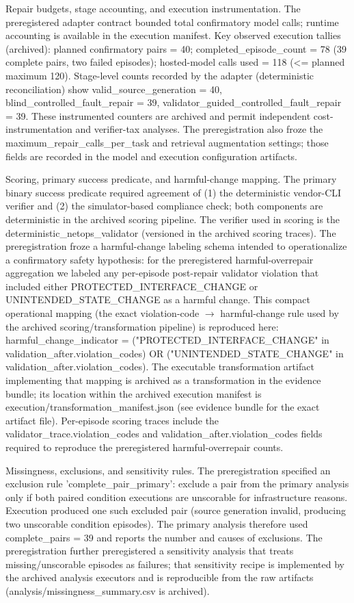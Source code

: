 \documentclass[conference]{IEEEtran}
\begin{document}
Repair budgets, stage accounting, and execution instrumentation. The preregistered adapter contract bounded total confirmatory model calls; runtime accounting is available in the execution manifest. Key observed execution tallies (archived): planned confirmatory pairs = 40; completed\_episode\_count = 78 (39 complete pairs, two failed episodes); hosted-model calls used = 118 (<= planned maximum 120). Stage-level counts recorded by the adapter (deterministic reconciliation) show valid\_source\_generation = 40, blind\_controlled\_fault\_repair = 39, validator\_guided\_controlled\_fault\_repair = 39. These instrumented counters are archived and permit independent cost-instrumentation and verifier-tax analyses. The preregistration also froze the maximum\_repair\_calls\_per\_task and retrieval augmentation settings; those fields are recorded in the model and execution configuration artifacts.

Scoring, primary success predicate, and harmful-change mapping. The primary binary success predicate required agreement of (1) the deterministic vendor-CLI verifier and (2) the simulator-based compliance check; both components are deterministic in the archived scoring pipeline. The verifier used in scoring is the deterministic\_netops\_validator (versioned in the archived scoring traces). The preregistration froze a harmful-change labeling schema intended to operationalize a confirmatory safety hypothesis: for the preregistered harmful-overrepair aggregation we labeled any per-episode post-repair validator violation that included either PROTECTED\_INTERFACE\_CHANGE or UNINTENDED\_STATE\_CHANGE as a harmful change. This compact operational mapping (the exact violation-code \ensuremath{\rightarrow} harmful-change rule used by the archived scoring/transformation pipeline) is reproduced here: harmful\_change\_indicator = ("PROTECTED\_INTERFACE\_CHANGE" in validation\_after.violation\_codes) OR ("UNINTENDED\_STATE\_CHANGE" in validation\_after.violation\_codes). The executable transformation artifact implementing that mapping is archived as a transformation in the evidence bundle; its location within the archived execution manifest is execution/transformation\_manifest.json (see evidence bundle for the exact artifact file). Per-episode scoring traces include the validator\_trace.violation\_codes and validation\_after.violation\_codes fields required to reproduce the preregistered harmful-overrepair counts.

Missingness, exclusions, and sensitivity rules. The preregistration specified an exclusion rule 'complete\_pair\_primary': exclude a pair from the primary analysis only if both paired condition executions are unscorable for infrastructure reasons. Execution produced one such excluded pair (source generation invalid, producing two unscorable condition episodes). The primary analysis therefore used complete\_pairs = 39 and reports the number and causes of exclusions. The preregistration further preregistered a sensitivity analysis that treats missing/unscorable episodes as failures; that sensitivity recipe is implemented by the archived analysis executors and is reproducible from the raw artifacts (analysis/missingness\_summary.csv is archived).
\end{document}

